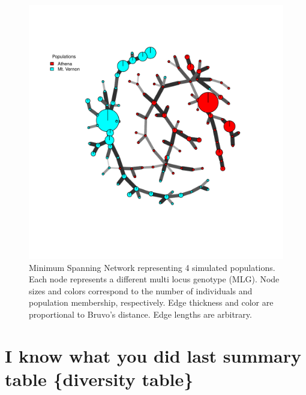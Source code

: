 \documentclass[letterpaper]{article}\usepackage[]{graphicx}\usepackage[]{color}
\newenvironment{knitrout}{}{} %
\begin{document}
\begin{figure}[ht!]
  \centering
  \caption{\footnotesize Minimum Spanning Network representing 4 simulated populations. Each node represents a different multi locus genotype (MLG). Node sizes and colors correspond to the number of individuals and population membership, respectively. Edge thickness and color are proportional to Bruvo's distance. Edge lengths are arbitrary.}
  \label{mst_poppr}
\begin{knitrout}\footnotesize
{}\color{fgcolor}

{\centering \includegraphics[width=0.8\linewidth]{figure/poppr_msn_fig} 

}



\end{knitrout}

\end{figure}
\newpage
\section{I know what you did last summary table \{diversity table\}}\label{summary}
\end{document}
